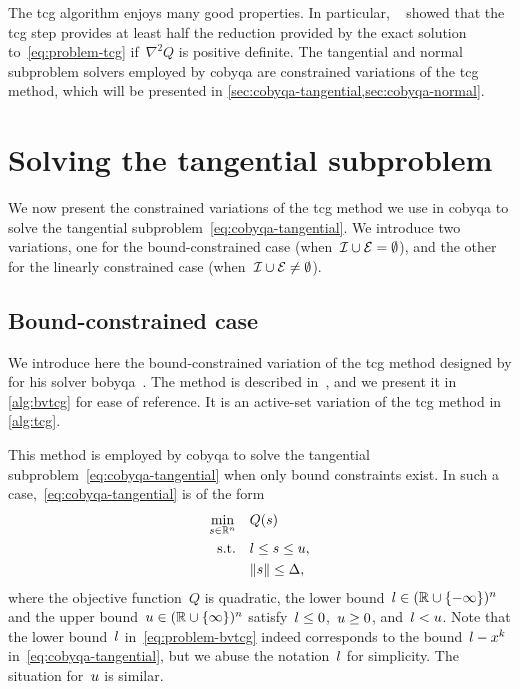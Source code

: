 The \gls{tcg} algorithm enjoys many good properties.
In particular, \citeauthor{Yuan_2000}~\cite{Yuan_2000} showed that the \gls{tcg} step provides at least half the reduction provided by the exact solution to~\cref{eq:problem-tcg} if~$\nabla^2 Q$ is positive definite.
The tangential and normal subproblem solvers employed by \gls{cobyqa} are constrained variations of the \gls{tcg} method,  which will be presented in \cref{sec:cobyqa-tangential,sec:cobyqa-normal}.

\section{Solving the tangential subproblem}
\label{sec:cobyqa-tangential}

We now present the constrained variations of the \gls{tcg} method we use in \gls{cobyqa} to solve the tangential subproblem~\cref{eq:cobyqa-tangential}.
We introduce two variations, one for the bound-constrained case (when~$\mathcal{I} \cup \mathcal{E} = \emptyset$), and the other for the linearly constrained case (when~$\mathcal{I} \cup \mathcal{E} \neq \emptyset$).

\subsection{Bound-constrained case}

We introduce here the bound-constrained variation of the \gls{tcg} method designed by \citeauthor{Powell_2009} for his solver \gls{bobyqa}~\cite{Powell_2009}.
The method is described in~\cite[\S~3]{Powell_2009}, and we present it in \cref{alg:bvtcg} for ease of reference.
It is an active-set variation of the \gls{tcg} method in \cref{alg:tcg}.

This method is employed by \gls{cobyqa} to solve the tangential subproblem~\cref{eq:cobyqa-tangential} when only bound constraints exist.
In such a case,~\cref{eq:cobyqa-tangential} is of the form
\begin{subequations}
    \label{eq:problem-bvtcg}
    \begin{align}
        \min_{\sstep \in \R^n}  & \quad Q(\sstep) \label{eq:problem-bvtcg-obj}\\
        \text{s.t.}             & \quad \xl \le \sstep \le \xu,\\
                                & \quad \norm{\sstep} \le \rad,
    \end{align}
\end{subequations}
where the objective function~$Q$ is quadratic, the lower bound~$l \in (\mathbb{R} \cup \{-\infty\})^n$ and the upper bound~$u \in (\mathbb{R} \cup \{\infty\})^n$ satisfy~$l \le 0$,~$u \ge 0$, and~$l < u$.
Note that the lower bound~$l$ in~\cref{eq:problem-bvtcg} indeed corresponds to the bound~$\xl - \iter[k]$ in~\cref{eq:cobyqa-tangential}, but we abuse the notation~$l$ for simplicity.
The situation for~$u$ is similar.

